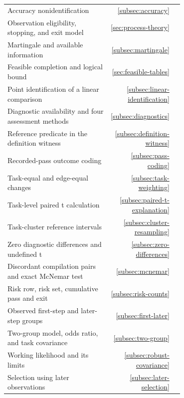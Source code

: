 \begin{longtable}{p{0.70\linewidth}rr}
Accuracy nonidentification & \ref{subsec:accuracy} & \pageref{subsec:accuracy} \\
Observation eligibility, stopping, and exit model & \ref{sec:process-theory} & \pageref{sec:process-theory} \\
Martingale and available information & \ref{subsec:martingale} & \pageref{subsec:martingale} \\
Feasible completion and logical bound & \ref{sec:feasible-tables} & \pageref{sec:feasible-tables} \\
Point identification of a linear comparison & \ref{subsec:linear-identification} & \pageref{subsec:linear-identification} \\
Diagnostic availability and four assessment methods & \ref{subsec:diagnostics} & \pageref{subsec:diagnostics} \\
Reference predicate in the definition witness & \ref{subsec:definition-witness} & \pageref{subsec:definition-witness} \\
Recorded-pass outcome coding & \ref{subsec:pass-coding} & \pageref{subsec:pass-coding} \\
Task-equal and edge-equal changes & \ref{subsec:task-weighting} & \pageref{subsec:task-weighting} \\
Task-level paired t calculation & \ref{subsec:paired-t-explanation} & \pageref{subsec:paired-t-explanation} \\
Task-cluster reference intervals & \ref{subsec:cluster-resampling} & \pageref{subsec:cluster-resampling} \\
Zero diagnostic differences and undefined t & \ref{subsec:zero-differences} & \pageref{subsec:zero-differences} \\
Discordant compilation pairs and exact McNemar test & \ref{subsec:mcnemar} & \pageref{subsec:mcnemar} \\
Risk row, risk set, cumulative pass and exit & \ref{subsec:risk-counts} & \pageref{subsec:risk-counts} \\
Observed first-step and later-step groups & \ref{subsec:first-later} & \pageref{subsec:first-later} \\
Two-group model, odds ratio, and task covariance & \ref{subsec:two-group} & \pageref{subsec:two-group} \\
Working likelihood and its limits & \ref{subsec:robust-covariance} & \pageref{subsec:robust-covariance} \\
Selection using later observations & \ref{subsec:later-selection} & \pageref{subsec:later-selection} \\
\end{longtable}
\normalsize
